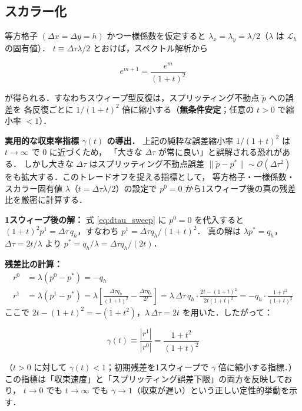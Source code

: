 \subsection*{スカラー化}

等方格子 $(\Delta x = \Delta y = h)$ かつ一様係数を仮定すると
$\lambda_x = \lambda_y = \lambda/2$（$\lambda$ は $\mathcal{L}_h$ の固有値）．
$t \equiv \Delta\tau\lambda/2$ とおけば，スペクトル解析から

\begin{equation}
  e^{m+1} = \frac{e^m}{(1+t)^2}
  \label{eq:error_contraction}
\end{equation}

が得られる．すなわちスウィープ型反復は，スプリッティング不動点 $\tilde{p}$ への誤差を
各反復ごとに $1/(1+t)^2$ 倍に縮小する（\textbf{無条件安定}；任意の $t > 0$ で縮小率 $< 1$）．

\medskip
\textbf{実用的な収束率指標 $\gamma(t)$ の導出．}
上記の純粋な誤差縮小率 $1/(1+t)^2$ は $t \to \infty$ で $0$ に近づくため，
「大きな $\Delta\tau$ が常に良い」と誤解される恐れがある．
しかし大きな $\Delta\tau$ はスプリッティング不動点誤差 $\|\tilde{p} - p^*\| \sim \mathcal{O}(\Delta\tau^2)$
をも拡大する．このトレードオフを捉える指標として，
等方格子・一様係数・スカラー固有値 $\lambda$（$t = \Delta\tau\lambda/2$）の設定で
$p^0 = 0$ から1スウィープ後の真の残差比を厳密に計算する．

\textbf{1スウィープ後の解：} 式 \eqref{eq:dtau_sweep} に $p^0 = 0$ を代入すると
$(1+t)^2 p^1 = \Delta\tau\,q_h$，すなわち $p^1 = \Delta\tau q_h/(1+t)^2$．
真の解は $\lambda p^* = q_h$，$\Delta\tau = 2t/\lambda$ より
$p^* = q_h/\lambda = \Delta\tau q_h/(2t)$．

\textbf{残差比の計算：}
\begin{align*}
  r^0 &= \lambda(p^0 - p^*) = -q_h \\
  r^1 &= \lambda(p^1 - p^*) = \lambda\!\left[\frac{\Delta\tau q_h}{(1+t)^2} - \frac{\Delta\tau q_h}{2t}\right]
       = \lambda\,\Delta\tau\,q_h \cdot \frac{2t - (1+t)^2}{2t(1+t)^2}
       = -q_h\cdot\frac{1+t^2}{(1+t)^2}
\end{align*}
ここで $2t-(1+t)^2 = -(1+t^2)$，$\lambda\,\Delta\tau = 2t$ を用いた．したがって：

\begin{equation}
  \gamma(t) \equiv \frac{|r^1|}{|r^0|} = \frac{1 + t^2}{(1+t)^2}
  \label{eq:gamma_t}
\end{equation}

（$t > 0$ に対して $\gamma(t) < 1$；初期残差を1スウィープで $\gamma$ 倍に縮小する指標．）
この指標は「収束速度」と「スプリッティング誤差下限」の両方を反映しており，
$t \to 0$ でも $t \to \infty$ でも $\gamma \to 1$（収束が遅い）という正しい定性的挙動を示す．

